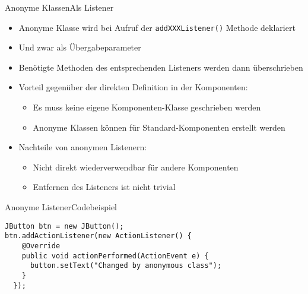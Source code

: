 \begin{frame}{Anonyme Klassen}{Als Listener}
    \begin{itemize}
        \item Anonyme Klasse wird bei Aufruf der \texttt{addXXXListener()} Methode deklariert
        \item Und zwar als Übergabeparameter
        \item Benötigte Methoden des entsprechenden Listeners werden dann überschrieben
        \item Vorteil gegenüber der direkten Definition in der Komponenten:
        \begin{itemize}
            \item Es muss keine eigene Komponenten-Klasse geschrieben werden
            \item Anonyme Klassen können für Standard-Komponenten erstellt werden
        \end{itemize}
        \item Nachteile von anonymen Listenern:
        \begin{itemize}
            \item Nicht direkt wiederverwendbar für andere Komponenten
            \item Entfernen des Listeners ist nicht trivial
        \end{itemize}
    \end{itemize}
\end{frame}

\begin{frame}[fragile]{Anonyme Listener}{Codebeispiel}
\lstset{style=java}
\begin{lstlisting}
JButton btn = new JButton();
btn.addActionListener(new ActionListener() {
    @Override
    public void actionPerformed(ActionEvent e) {
      button.setText("Changed by anonymous class");
    }
  });
\end{lstlisting}
\end{frame}

